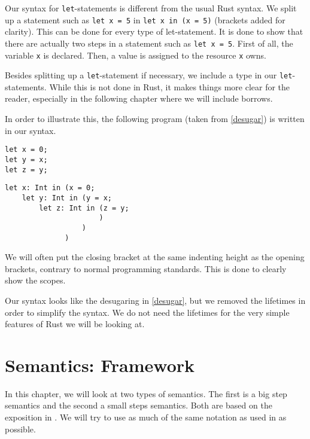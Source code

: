Our syntax for \texttt{let}-statements is different from the usual Rust syntax. We split up a statement such as \verb|let x = 5| in \texttt{let x in (x = 5)} (brackets added for clarity). This can be done for every type of let-statement. It is done to show that there are actually two steps in a statement such as \texttt{let x = 5}. First of all, the variable \verb|x| is declared. Then, a value is assigned to the resource \verb|x| owns. 

Besides splitting up a \texttt{let}-statement if necessary, we include a type in our \texttt{let}-statements. While this is not done in Rust, it makes things more clear for the reader, especially in the following chapter where we will include borrows. 

In order to illustrate this, the following program (taken from \ref{desugar}) is written in our syntax. 

\begin{verbatim}
let x = 0;
let y = x;
let z = y;
\end{verbatim}

\begin{verbatim}
let x: Int in (x = 0;
    let y: Int in (y = x;
        let z: Int in (z = y;
                      )
                  )
              )
\end{verbatim}

We will often put the closing bracket at the same indenting height as the opening brackets, contrary to normal programming standards. This is done to clearly show the scopes. 

Our syntax looks like the desugaring in \ref{desugar}, but we removed the lifetimes in order to simplify the syntax. We do not need the lifetimes for the very simple features of Rust we will be looking at. 


\section{Semantics: Framework}
In this chapter, we will look at two types of semantics. The first is a big step semantics and the second a small steps semantics. Both are based on the exposition in \cite{nielson1992semantics}. We will try to use as much of the same notation as used in \cite{nielson1992semantics} as possible. 

